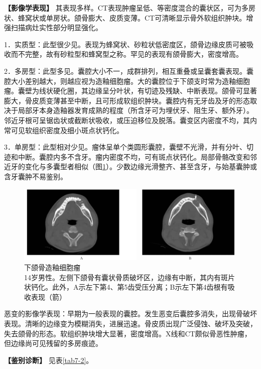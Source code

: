 \textbf{【影像学表现】}
其表现多样。CT表现肿瘤呈低、等密度混合的囊状区，可为多房状、蜂窝状或单房状。颌骨膨大、皮质变薄。CT可清晰显示骨外软组织肿块。增强扫描病灶实性部分明显强化。

1．实质型：此型很少见。表现为蜂窝状、砂粒状低密度区，颌骨边缘皮质可被吸收而不完整，故有砂粒型和蜂窝型之称。罕见的表现有颌骨膨大，密度增高。

2．多房型：此型多见。囊腔大小不一，成群排列，相互重叠或呈囊套囊表现。囊腔大小差别越大，则越应视为造釉细胞瘤。大的囊腔位于下颌支时常为造釉细胞瘤。囊壁为线状硬化圈，其边缘呈分叶状，有切迹及残缺、中断表现。颌骨可显著膨大，骨皮质变薄甚至中断，且可形成软组织肿块。囊腔内有无牙齿及牙的形态取决于局部牙本身造釉器发育成熟的程度（所含牙可为埋伏牙、阻生牙、额外牙）。邻近牙根可呈锯齿状或截断状吸收，或压迫移位及脱落。囊变区内密度不均，其内常可见软组织密度及细小斑点状钙化。

3．单房型：此型相对少见。瘤体呈单个类圆形囊腔，囊壁不光滑，并有分叶、切迹和中断。囊腔内多不含牙。瘤内密度不均，可有斑点状钙化。局部骨骼改变和邻近牙的变化与多囊型者相似（图\ref{fig7-4}）。少数边缘光滑整齐、甚至含牙，与始基囊肿或含牙囊肿不易鉴别。

\begin{figure}[!htbp]
 \centering
 \includegraphics[width=.7\textwidth,height=\textheight,keepaspectratio]{./images/Image00158.jpg}
 \captionsetup{justification=centering}
 \caption{下颌骨造釉细胞瘤\\{\small 14岁男性。左侧下颌骨有囊状骨质破坏区，边缘有中断，其内有斑片状钙化。此外，A示左下第4、第5齿受压分离；B示左下第4齿根有吸收表现（箭）}}
 \label{fig7-4}
  \end{figure} 

恶变的影像学表现：早期为一般表现的囊腔。发生恶变后囊腔多消失，出现骨破坏表现。清晰的边缘变为模糊消失，进展迅速。骨皮质出现广泛侵蚀、破坏及突破，失去颌骨的形态。软组织肿块增大显著，密度增高。X线和CT颇似骨恶性肿瘤，但边缘尚可见残留的多房痕迹。

\textbf{【鉴别诊断】} 见表\ref{tab7-2}。

